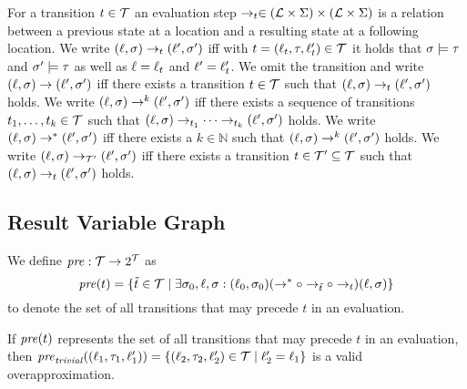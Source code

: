 \begin{definition}[Evaluation] 
  For a transition $t \in \mathcal{T}$ an evaluation step $\rightarrow_t \in (\mathcal{L} \times \Sigma) \times (\mathcal{L} \times \Sigma)$ is a relation between a previous state at a location and a resulting state at a following location.
  We write $(\ell, \sigma) \rightarrow_t (\ell', \sigma')$ iff with $t = (\ell_t, \tau, \ell_t') \in \mathcal{T}$ it holds that $\sigma \models \tau$ and $\sigma' \models \tau$ as well as $\ell = \ell_t$ and $\ell' = \ell_t'$.
  We omit the transition and write $(\ell, \sigma) \rightarrow (\ell', \sigma')$ iff there exists a transition $t \in \mathcal{T}$ such that $(\ell, \sigma) \rightarrow_t (\ell', \sigma')$ holds.
  We write $(\ell, \sigma) \rightarrow^k (\ell', \sigma')$ iff there exists a sequence of transitions $t_1, \dots, t_k \in \mathcal{T}$ such that $(\ell, \sigma) \rightarrow_{t_1} \dots \rightarrow_{t_k} (\ell', \sigma')$ holds.
  We write $(\ell, \sigma) \rightarrow^* (\ell', \sigma')$ iff there exists a $k \in \mathbb{N}$ such that $(\ell, \sigma) \rightarrow^k (\ell', \sigma')$ holds.
  We write $(\ell, \sigma) \rightarrow_{\mathcal{T}'} (\ell', \sigma')$ iff there exists a transition $t \in \mathcal{T}' \subseteq \mathcal{T}$ such that $(\ell, \sigma) \rightarrow_t (\ell', \sigma')$ holds.
\end{definition}


\subsection{Result Variable Graph}

\begin{definition} 
  We define $\mathit{pre}: \mathcal{T} \rightarrow 2^{\mathcal{T}}$ as
  \[\mathit{pre}(t) = \lbrace \tilde{t} \in \mathcal{T} \mid \exists \sigma_0, \ell, \sigma: (\ell_0, \sigma_0) (\rightarrow^* \circ \rightarrow_{\tilde{t}} \circ \rightarrow_{t}) (\ell, \sigma) \rbrace\]
  to denote the set of all transitions that may precede $t$ in an evaluation.	
\end{definition}

If $\mathit{pre}(t)$ represents the set of all transitions that may precede $t$ in an evaluation, then $\mathit{pre}_{\mathit{trivial}}((\ell_1, \tau_1, \ell_1')) = \lbrace (\ell_2, \tau_2, \ell_2') \in \mathcal{T} \mid \ell_2' = \ell_1 \rbrace$ is a valid overapproximation.

